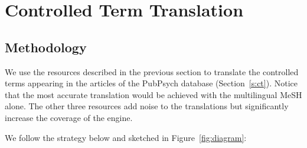 \documentclass[a4paper,11pt]{article}
\begin{document}
	\section{Controlled Term Translation}
	\label{s:cttrad}
	
	\subsection{Methodology}
	We use the resources described in the previous section to translate the controlled terms appearing in the articles of the PubPsych database (Section~\ref{s:ct}).
	Notice that the most accurate translation would be achieved with the multilingual MeSH alone. The other three resources add noise to the translations but significantly increase the coverage of the engine.
	
	\bigskip
	\noindent
	We follow the strategy below and sketched in Figure~\ref{fig:diagram}:
\end{document}
